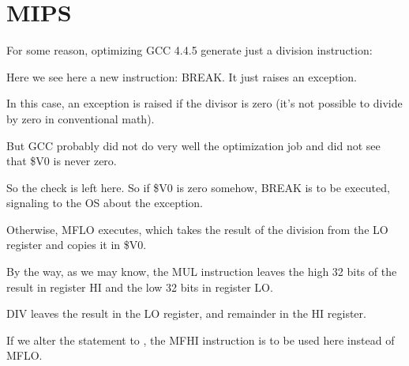 ﻿\section{MIPS}

For some reason, optimizing GCC 4.4.5 generate just a division instruction:



Here we see here a new instruction: BREAK. It just raises an exception.

In this case, an exception is raised if the divisor is zero (it's not possible to divide by zero 
in conventional math).

But GCC probably did not do very well the optimization job and did not see that \$V0 is never zero.

So the check is left here.
So if \$V0 is zero somehow, BREAK is to be executed, signaling to the \ac{OS} about the exception.

Otherwise, MFLO executes, which takes the result of the division from the LO register and copies it in \$V0.

By the way, as we may know, the MUL instruction leaves the high 32 bits of 
the result in register HI and the low 32 bits in register LO.

DIV leaves the result in the LO register, and remainder in the HI register.

If we alter the statement to , 
the MFHI instruction is to be used here instead of MFLO.

